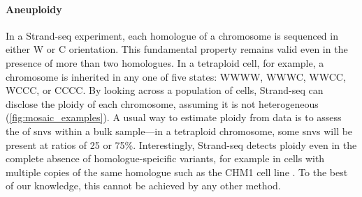 

\paragraph{Aneuploidy}
In a Strand-seq experiment, each homologue of a chromosome is sequenced in
either W or C orientation. This fundamental property remains valid even in the
presence of more than two homologues. In a tetraploid cell, for example, a
chromosome is inherited in any one of five states: WWWW, WWWC, WWCC, WCCC, or
CCCC. By looking across a population of cells, Strand-seq can disclose the
ploidy of each chromosome, assuming it is not heterogeneous
(\cref{fig:mosaic_examples}). A
usual way to estimate ploidy from \mps data is to assess the \baf of \acp{snv} within a bulk
sample---in a tetraploid chromosome, some \acp{snv} will be present at ratios of
25 or 75\%. Interestingly, Strand-seq detects ploidy even in the complete
absence of homologue-speicific variants, for example in cells with multiple
copies of the same homologue such as the CHM1 cell line \citep{Steinberg2014}.
To the best of our knowledge, this cannot be achieved by any other method.


